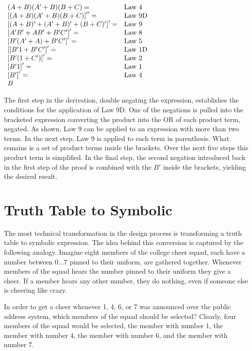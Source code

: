 $\begin{array}[ht]{ll}
(A+B)(A'+B)(B+C) = 			& \text{Law 4} \\
\left[ (A+B)(A'+B)(B+C) \right] '' =& \text{Law 9D} \\
\left[ (A+B)'+(A'+B)'+(B+C)' \right]' = & \text{Law 9} \\
\left[ A'B'+AB'+B'C' \right]' = 	& \text{Law 8} \\
\left[ B'(A'+A)+B'C' \right]' = 	& \text{Law 5} \\
\left[ [B'1+ B'C' \right]' = 		& \text{Law 1D} \\
\left[ B'(1+C') \right]' = 		& \text{Law 2} \\
\left[ B'1 \right]' = 			& \text{Law 1} \\
\left[ B' \right]' = 			& \text{Law 4} \\
B  &  
\end{array}$

The first step in the derivation, double negating the expression, establishes 
the conditions for the application of Law 9D. One of the negations is
pulled into the bracketed expression converting the product into 
the OR of each product term, negated.  As shown, Law 9 can be applied
to an expression with more than two terms.  In the next step, Law 9 is 
applied to each term in parenthesis.  What remains is a set of product 
terms inside the brackets.  Over the next five steps this product term 
is simplified.  In the final step, the second negation introduced 
back in the first step of the proof is combined with the $B'$ 
inside the brackets, yielding the desired result.

\section{Truth Table to Symbolic}
\label{sec:representationsTTtoSymb}

The most technical transformation in the design process is transforming 
a truth table to symbolic expression.  The idea behind this conversion is 
captured by the following analogy.  Imagine eight members of the college 
cheer squad, each have a number between $0 \ldots 7$ pinned to their
uniform, are gathered together.  Whenever members of the squad hears
the number pinned to their uniform they give a cheer.  If a member hears
any other number, they do nothing, even if someone else is cheering like crazy.

In order to get a cheer whenever 1, 4, 6, or 7 was announced 
over the public address system, which members of the squad should be
selected?  Clearly, four members of the squad would be selected, the member
with number 1, the member with number 4, the member with number 6,
and the member with number 7.

